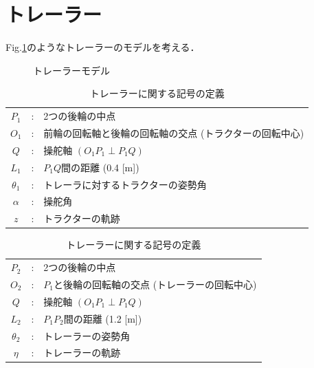 \section{トレーラー}
Fig.\ref{fig:trailermodel}のようなトレーラーのモデルを考える．
\begin{figure}[H]
 \begin{center}
  \caption{トレーラーモデル}
  \label{fig:trailermodel}
 \end{center}
\end{figure}
%
\newpage
%
\begin{table}[H]
 \begin{center}
 \caption{トラクターに関する記号の定義}
 \begin{tabular}{ccl}\hline
  $P_1$ & : & 2つの後輪の中点 \\
  $O_1$ & : & 前輪の回転軸と後輪の回転軸の交点 (トラクターの回転中心) \\
  $Q$ & : & 操舵軸 $(O_1 P_1 \perp P_1 Q)$ \\
  $L_1$ & : & $P_1 Q$間の距離 (0.4 [m])\\
  $\theta_1$ & : & トレーラに対するトラクターの姿勢角 \\
  $\alpha$ & : & 操舵角 \\
  $z$ & : & トラクターの軌跡
 \end{tabular}
 \end{center}
 \begin{center}
 \caption{トレーラーに関する記号の定義}
 \begin{tabular}{ccl}\hline
  $P_2$ & : & 2つの後輪の中点 \\
  $O_2$ & : & $P_1$と後輪の回転軸の交点 (トレーラーの回転中心) \\
  $Q$ & : & 操舵軸 $(O_1 P_1 \perp P_1 Q)$ \\
  $L_2$ & : & $P_1 P_2$間の距離 (1.2 [m]) \\
  $\theta_2$ & : & トレーラーの姿勢角 \\
  $\eta$ & : & トレーラーの軌跡
 \end{tabular}
 \end{center}
\end{table}


